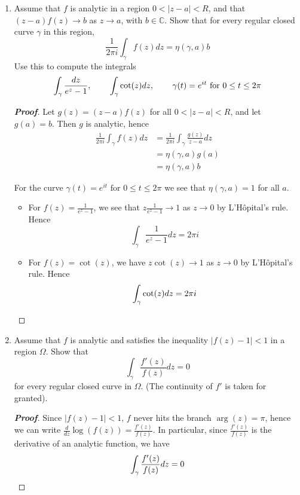 \documentclass[12pt,leqno]{article}
\theoremstyle{definition}
\newcommand{\C}{\mathbb{C}}
\newenvironment{Proof}{\begin{proof}[\textnormal{\textbf{Proof}}]}{\end{proof}}
\begin{document}
\begin{enumerate}
\begin{Proof}
  \end{Proof}
 \item Assume that $f$ is analytic in a region $0<|z-a|<R$, and that $(z-a)f(z)\to b$ as $z\to a$, with $b\in\C$. Show that for every regular closed curve $\gamma$ in this region, \[\frac{1}{2\pi i}\int_{\gamma}f(z)dz=\eta(\gamma,a)b\] Use this to compute the integrals \[\int_{\gamma}\frac{dz}{e^z-1},\hskip.3in\int_{\gamma}\cot(z)dz,\hskip.3in\gamma(t)=e^{it}\text{ for }0\leq t\leq2\pi\]
  \begin{Proof}
   Let $g(z)=(z-a)f(z)$ for all $0<|z-a|<R$, and let $g(a)=b$. Then $g$ is analytic, hence \begin{align*}\frac{1}{2\pi i}\int_{\gamma}f(z)dz&=\frac{1}{2\pi i}\int_{\gamma}\frac{g(z)}{z-a}dz\\&=\eta(\gamma,a)g(a)\\&=\eta(\gamma,a)b\end{align*}

   For the curve $\gamma(t)=e^{it}\text{ for }0\leq t\leq2\pi$ we see that $\eta(\gamma,a)=1$ for all $a$.
   \begin{itemize}
    \item For $f(z)=\frac{1}{e^z-1}$, we see that $z\frac{1}{e^z-1}\to1$ as $z\to0$ by L'H\^{o}pital's rule. Hence \[\int_{\gamma}\frac{1}{e^z-1}dz=2\pi i\]
    \item For $f(z)=\cot(z)$, we have $z\cot(z)\to1$ as $z\to0$ by L'H\^{o}pital's rule. Hence \[\int_{\gamma}\cot(z)dz=2\pi i\qedhere\]
   \end{itemize}
  \end{Proof}
  \item Assume that $f$ is analytic and satisfies the inequality $|f(z)-1|<1$ in a region $\Omega$. Show that \[\int_{\gamma}\frac{f'(z)}{f(z)}dz=0\] for every regular closed curve in $\Omega$. (The continuity of $f'$ is taken for granted).
  \begin{Proof}
   Since $|f(z)-1|<1$, $f$ never hits the branch $\arg(z)=\pi$, hence we can write $\frac{d}{dz}\log(f(z))=\frac{f'(z)}{f(z)}$. In particular, since $\frac{f'(z)}{f(z)}$ is the derivative of an analytic function, we have \[\int_{\gamma}\frac{f'(z)}{f(z)}dz=0\qedhere\]
  \end{Proof}
\end{enumerate}
\end{document}
